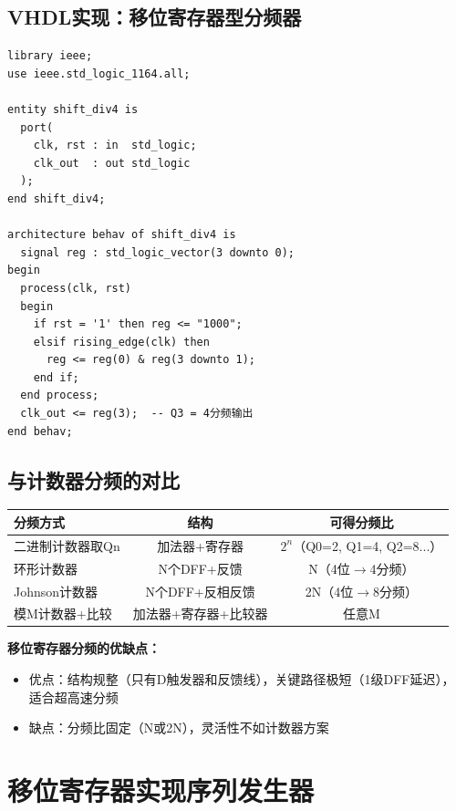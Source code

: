 \subsection{VHDL实现：移位寄存器型分频器}

\begin{lstlisting}[caption={4位环形计数器做4分频器}]
library ieee;
use ieee.std_logic_1164.all;

entity shift_div4 is
  port(
    clk, rst : in  std_logic;
    clk_out  : out std_logic
  );
end shift_div4;

architecture behav of shift_div4 is
  signal reg : std_logic_vector(3 downto 0);
begin
  process(clk, rst)
  begin
    if rst = '1' then reg <= "1000";
    elsif rising_edge(clk) then
      reg <= reg(0) & reg(3 downto 1);
    end if;
  end process;
  clk_out <= reg(3);  -- Q3 = 4分频输出
end behav;
\end{lstlisting}

\subsection{与计数器分频的对比}

\begin{center}
\begin{tabular}{|l|c|c|}
\hline
\textbf{分频方式} & \textbf{结构} & \textbf{可得分频比} \\
\hline
二进制计数器取Qn & 加法器+寄存器 & $2^n$（Q0=2, Q1=4, Q2=8...）\\
环形计数器 & N个DFF+反馈 & N（4位$\to$4分频）\\
Johnson计数器 & N个DFF+反相反馈 & 2N（4位$\to$8分频）\\
模M计数器+比较 & 加法器+寄存器+比较器 & 任意M \\
\hline
\end{tabular}
\end{center}

\textbf{移位寄存器分频的优缺点：}
\begin{itemize}
  \item 优点：结构规整（只有D触发器和反馈线），关键路径极短（1级DFF延迟），适合超高速分频
  \item 缺点：分频比固定（N或2N），灵活性不如计数器方案
\end{itemize}

\section{移位寄存器实现序列发生器}

